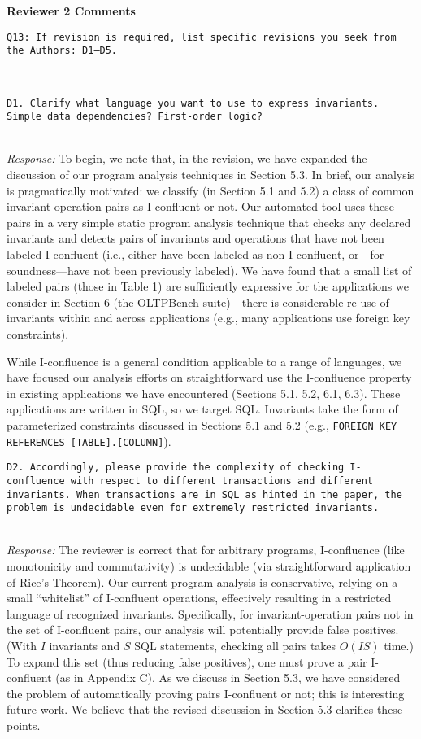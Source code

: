 \documentclass[10pt]{article}
\newcommand{\reviewer}[1] {\noindent\colorbox{reviewercolor}{\parbox{\textwidth}{\noindent\texttt{#1}}}\\}
\newcommand{\response}[1] {\noindent\textit{Response: } #1\\}
\newcommand{\reviewerstart}[1]{\noindent\textbf{\large{#1}}}
\begin{document}
\reviewerstart{Reviewer 2 Comments}\\
\label{r2c}

\reviewer{Q13: If revision is required, list specific revisions you seek from the Authors: D1--D5.}

\reviewer{D1. Clarify what language you want to use to express
  invariants. Simple data dependencies? First-order
  logic?}

\response{To begin, we note that, in the revision, we have expanded
  the discussion of our program analysis techniques in Section 5.3. In
  brief, our analysis is pragmatically motivated: we classify (in
  Section 5.1 and 5.2) a class of common invariant-operation pairs as
  I-confluent or not. Our automated tool uses these pairs in a very
  simple static program analysis technique that checks any declared
  invariants and detects pairs of invariants and operations that have
  not been labeled I-confluent (i.e., either have been labeled as
  non-I-confluent, or---for soundness---have not been previously
  labeled). We have found that a small list of labeled pairs (those in
  Table 1) are sufficiently expressive for the applications we
  consider in Section 6 (the OLTPBench suite)---there is considerable
  re-use of invariants within and across applications (e.g., many
  applications use foreign key constraints).

  While I-confluence is a general condition applicable to a range of
  languages, we have focused our analysis efforts on straightforward
  use the I-confluence property in existing applications we have
  encountered (Sections 5.1, 5.2, 6.1, 6.3). These applications are written in
  SQL, so we target SQL. Invariants take the form of parameterized
  constraints discussed in Sections 5.1 and 5.2 (e.g., \texttt{FOREIGN
    KEY REFERENCES [TABLE].[COLUMN]}).}

\reviewer{D2. Accordingly, please provide the complexity of checking 
  I-confluence with respect to different transactions and different 
  invariants. When transactions are in SQL as hinted in the paper, the 
  problem is undecidable even for extremely restricted invariants.}

\response{The reviewer is correct that for arbitrary programs,
  I-confluence (like monotonicity and commutativity) is undecidable
  (via straightforward application of Rice's Theorem). Our current
  program analysis is conservative, relying on a small ``whitelist''
  of I-confluent operations, effectively resulting in a restricted
  language of recognized invariants. Specifically, for
  invariant-operation pairs not in the set of I-confluent pairs, our
  analysis will potentially provide false positives. (With $I$
  invariants and $S$ SQL statements, checking all pairs takes $O(IS)$
  time.) To expand this set (thus reducing false positives), one must
  prove a pair I-confluent (as in Appendix C).  As we discuss in
  Section 5.3, we have considered the problem of automatically proving
  pairs I-confluent or not; this is interesting future work. We
  believe that the revised discussion in Section 5.3 clarifies these points.}
\end{document}

